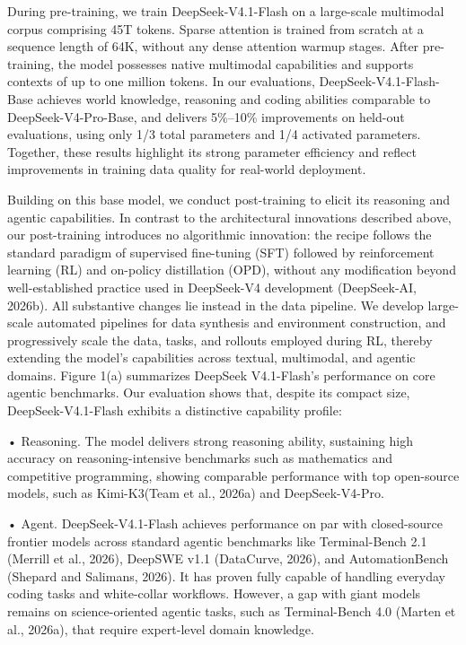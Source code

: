 \documentclass[
  10
]{article}
\begin{document}
During pre-training, we train DeepSeek-V4.1-Flash on a large-scale
multimodal corpus comprising 45T tokens. Sparse attention is trained
from scratch at a sequence length of 64K, without any dense attention
warmup stages. After pre-training, the model possesses native multimodal
capabilities and supports contexts of up to one million tokens. In our
evaluations, DeepSeek-V4.1-Flash-Base achieves world knowledge,
reasoning and coding abilities comparable to DeepSeek-V4-Pro-Base, and
delivers 5\%--10\% improvements on held-out evaluations, using only 1/3
total parameters and 1/4 activated parameters. Together, these results
highlight its strong parameter efficiency and reflect improvements in
training data quality for real-world deployment.

Building on this base model, we conduct post-training to elicit its
reasoning and agentic capabilities. In contrast to the architectural
innovations described above, our post-training introduces no algorithmic
innovation: the recipe follows the standard paradigm of supervised
fine-tuning (SFT) followed by reinforcement learning (RL) and on-policy
distillation (OPD), without any modification beyond well-established
practice used in DeepSeek-V4 development (DeepSeek-AI, 2026b). All
substantive changes lie instead in the data pipeline. We develop
large-scale automated pipelines for data synthesis and environment
construction, and progressively scale the data, tasks, and rollouts
employed during RL, thereby extending the model's capabilities across
textual, multimodal, and agentic domains. Figure 1(a) summarizes
DeepSeek V4.1-Flash's performance on core agentic benchmarks. Our
evaluation shows that, despite its compact size, DeepSeek-V4.1-Flash
exhibits a distinctive capability profile:

• Reasoning. The model delivers strong reasoning ability, sustaining
high accuracy on reasoning-intensive benchmarks such as mathematics and
competitive programming, showing comparable performance with top
open-source models, such as Kimi-K3(Team et al., 2026a) and
DeepSeek-V4-Pro.

• Agent. DeepSeek-V4.1-Flash achieves performance on par with
closed-source frontier models across standard agentic benchmarks like
Terminal-Bench 2.1 (Merrill et al., 2026), DeepSWE v1.1 (DataCurve,
2026), and AutomationBench (Shepard and Salimans, 2026). It has proven
fully capable of handling everyday coding tasks and white-collar
workflows. However, a gap with giant models remains on science-oriented
agentic tasks, such as Terminal-Bench 4.0 (Marten et al., 2026a), that
require expert-level domain knowledge.
\end{document}

